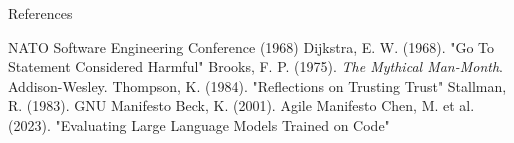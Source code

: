 \documentclass{beamer}
\begin{document}
\begin{frame}{References}
\begin{thebibliography}{10}
 NATO Software Engineering Conference (1968)
 Dijkstra, E. W. (1968). "Go To Statement Considered Harmful"
 Brooks, F. P. (1975). \textit{The Mythical Man-Month}. Addison-Wesley. %
 Thompson, K. (1984). "Reflections on Trusting Trust"
 Stallman, R. (1983). GNU Manifesto
 Beck, K. (2001). Agile Manifesto
 Chen, M. et al. (2023). "Evaluating Large Language Models Trained on Code"
\end{thebibliography}
\end{frame}
\end{document}
